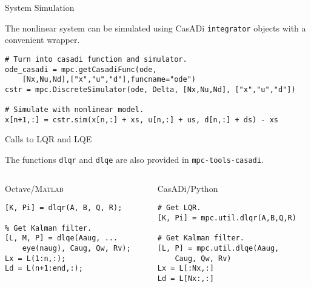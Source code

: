 \documentclass[xcolor=dvipsnames]{beamer}
\begin{document}
\begin{frame}[fragile]{System Simulation}

The nonlinear system can be simulated using CasADi \texttt{integrator} objects with a convenient wrapper.
    
\begin{lstlisting}[style=python]
# Turn into casadi function and simulator.
ode_casadi = mpc.getCasadiFunc(ode,
    [Nx,Nu,Nd],["x","u","d"],funcname="ode")
cstr = mpc.DiscreteSimulator(ode, Delta, [Nx,Nu,Nd], ["x","u","d"])

# Simulate with nonlinear model.
x[n+1,:] = cstr.sim(x[n,:] + xs, u[n,:] + us, d[n,:] + ds) - xs
\end{lstlisting}

\end{frame}

\begin{frame}[fragile]{Calls to LQR and LQE}

\vspace{-10pt}
The functions \texttt{dlqr} and \texttt{dlqe} are also provided in \texttt{mpc-tools-casadi}.
\begin{columns}[T]

\begin{column}[T]{0.49\textwidth}
\begin{block}{Octave/\textsc{Matlab}}

\begin{lstlisting}[style=matlab]
% Get LQR.
[K, Pi] = dlqr(A, B, Q, R);

% Get Kalman filter.
[L, M, P] = dlqe(Aaug, ...
    eye(naug), Caug, Qw, Rv);
Lx = L(1:n,:);
Ld = L(n+1:end,:);

\end{lstlisting}

\end{block}
\end{column}

\begin{column}[T]{0.49\textwidth}
\begin{block}{CasADi/Python}

\begin{lstlisting}[style=python]
# Get LQR.
[K, Pi] = mpc.util.dlqr(A,B,Q,R)

# Get Kalman filter.
[L, P] = mpc.util.dlqe(Aaug,
    Caug, Qw, Rv)
Lx = L[:Nx,:]
Ld = L[Nx:,:]        


\end{lstlisting}

\end{block}
\end{column}

\end{columns}     

\end{frame}
\end{document}
